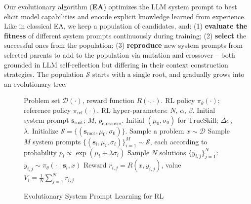 \documentclass{article}
\theoremstyle{plain}
\theoremstyle{definition}
\theoremstyle{remark}
\begin{document}
Our evolutionary algorithm (\textbf{EA}) optimizes the LLM system prompt to best elicit model capabilities and encode explicit knowledge learned from experience. Like in classical EA, we keep a population of candidates, and: (1) \textbf{evaluate the fitness} of different system prompts continuously during training; (2) \textbf{select} the successful ones from the population; (3) \textbf{reproduce} new system prompts from selected parents to add to the population via mutation and crossover -- both grounded in LLM self-reflection but differing in their context construction strategies. The population $\mathcal{S}$ starts with a single {root}, and gradually grows into an evolutionary tree.

\begin{figure}
  \vspace{-18pt}
  \begin{minipage}{0.59\textwidth}
  \begin{algorithm}[H]
    \caption{Evolutionary System Prompt Learning for RL}
    \label{alg:e-spl}
    \begin{algorithmic}
       Problem set $\mathcal{D}(\cdot)$, reward function $R(\cdot, \cdot)$.
       RL policy $\pi_{\theta}(\cdot)$; reference policy $\pi_{\text{ref}}(\cdot)$.
       RL hyper-parameters: $N$, $\alpha$, $\beta$.
       Initial system prompt $\mathbf{s}_{\text{root}}$; $M$, $p_{\text{crossover}}$.
       Initial $(\mu_{0}, \sigma_{0})$ for {$\mathrm{TrueSkill}$}; $\Delta\sigma$; $\lambda$.
      \STATE Initialize $\mathcal{S} = \{(\mathbf{s}_{\text{root}}, \mu_{0}, \sigma_{0})\}$. \hfill {}
      \STATE Sample a problem $x\sim \mathcal{D}$
      \STATE Sample $M$ system prompts $\{(\mathbf{s}_{i}, \mu_{i}, \sigma_{i})\}_{i=1}^{M} \sim \mathcal{S}$, each according to probability $p_{i} \propto \exp( \mu_{i} + \lambda \sigma_{i} )$
          \STATE Sample $N$ solutions $\{y_{i,j}\}_{j=1}^{N}$: $y_{i, j}\sim \pi_{\theta}(\cdot \mid \mathbf{s}_{i}, x)$
          \STATE Reward $r_{i,j} = R(x, y_{i, j})$, value {$V_{i} = \frac{1}{N} {\sum}_{j=1}^{N} r_{i,j}$}
      \ENDFOR
       \hfill {}
      \vspace{5pt}


\end{algorithmic}
\end{algorithm}
\end{minipage}
\end{figure}
\end{document}
